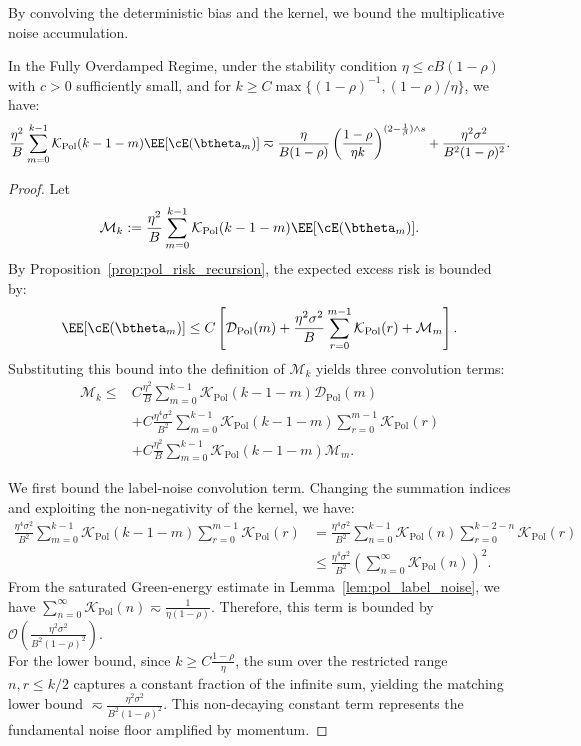 By convolving the deterministic bias and the kernel, we bound the multiplicative noise accumulation.

\begin{proposition}
\label{prop:pol_self_noise_bounds0}
In the Fully Overdamped Regime, under the stability condition $\eta\le cB(1-\rho)$ with $c>0$ sufficiently small, and for
$k\ge C\max\{(1-\rho)^{-1},(1-\rho)/\eta\}$, we have:
\[
    \frac{\eta^2}{B}\sum_{m=0}^{k-1}\mathcal{K}_{\mathrm{Pol}}(k-1-m)\EE[\cE(\btheta_m)]
    \eqsim
    \frac{\eta}{B(1-\rho)}
        \left(\frac{1-\rho}{\eta k}\right)^{(2-\frac1\beta)\wedge s}+\frac{\eta^2\sigma^2}{B^2(1-\rho)^2}.
\]
\end{proposition}

\begin{proof}
Let
\[
    \mathcal M_k:=
    \frac{\eta^2}{B}\sum_{m=0}^{k-1}\mathcal K_{\mathrm{Pol}}(k-1-m)\EE[\cE(\btheta_m)].
\]
By Proposition~\ref{prop:pol_risk_recursion}, the expected excess risk is bounded by:
\[
    \EE[\cE(\btheta_m)]
    \le
    C\left[
        \mathcal D_{\mathrm{Pol}}(m)
        +\frac{\eta^2\sigma^2}{B}\sum_{r=0}^{m-1}\mathcal K_{\mathrm{Pol}}(r)
        +\mathcal M_m
    \right].
\]
Substituting this bound into the definition of $\mathcal M_k$ yields three convolution terms:
\begin{align}
\label{eq:prop17_bootstrap_start}
    \mathcal M_k
    \le{}&
    C\frac{\eta^2}{B}\sum_{m=0}^{k-1}
        \mathcal K_{\mathrm{Pol}}(k-1-m)\mathcal D_{\mathrm{Pol}}(m) \nonumber \\
    & + C\frac{\eta^4\sigma^2}{B^2}\sum_{m=0}^{k-1}\mathcal K_{\mathrm{Pol}}(k-1-m)\sum_{r=0}^{m-1}\mathcal K_{\mathrm{Pol}}(r) \nonumber \\
    & + C\frac{\eta^2}{B}\sum_{m=0}^{k-1}
        \mathcal K_{\mathrm{Pol}}(k-1-m)\mathcal M_m .
\end{align}

We first bound the label-noise convolution term. Changing the summation indices and exploiting the non-negativity of the kernel, we have:
\begin{align*}
    \frac{\eta^4\sigma^2}{B^2}\sum_{m=0}^{k-1}\mathcal K_{\mathrm{Pol}}(k-1-m)\sum_{r=0}^{m-1}\mathcal K_{\mathrm{Pol}}(r)
    &= \frac{\eta^4\sigma^2}{B^2} \sum_{n=0}^{k-1} \mathcal K_{\mathrm{Pol}}(n) \sum_{r=0}^{k-2-n} \mathcal K_{\mathrm{Pol}}(r) \\
    &\le \frac{\eta^4\sigma^2}{B^2} \left( \sum_{n=0}^{\infty} \mathcal K_{\mathrm{Pol}}(n) \right)^2.
\end{align*}
From the saturated Green-energy estimate in Lemma~\ref{lem:pol_label_noise}, we have $\sum_{n=0}^{\infty} \mathcal K_{\mathrm{Pol}}(n) \eqsim \frac{1}{\eta(1-\rho)}$. Therefore, this term is bounded by $\mathcal{O}\left( \frac{\eta^2\sigma^2}{B^2(1-\rho)^2} \right)$. \\
For the lower bound, since $k \ge C\frac{1-\rho}{\eta}$, the sum over the restricted range $n, r \le k/2$ captures a constant fraction of the infinite sum, yielding the matching lower bound $\eqsim \frac{\eta^2\sigma^2}{B^2(1-\rho)^2}$. This non-decaying constant term represents the fundamental noise floor amplified by momentum.


\end{proof}
